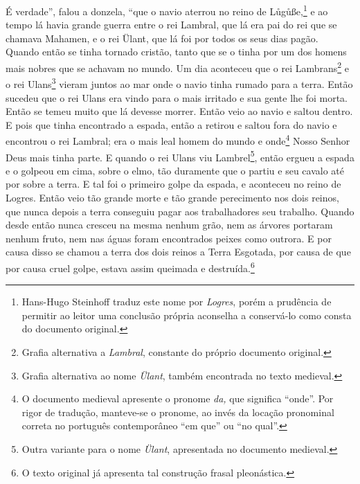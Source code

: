  É verdade”, falou a donzela, “que o navio aterrou no reino de
Lůgůße,\footnote{Hans-Hugo Steinhoff traduz este nome por \textit{Logres}, porém
a prudência de permitir ao leitor uma conclusão própria aconselha a conservá-lo
como consta do documento original.}  e ao tempo lá havia grande
guerra entre o rei Lambral, que lá era pai do rei que se chamava Mahamen, e o
rei Ülant, que lá foi por todos os seus dias pagão. Quando então se tinha
tornado cristão, tanto que se o tinha por um dos homens mais nobres que se
achavam no mundo. Um dia aconteceu que o rei Lambrans\footnote{ Grafia
alternativa a \textit{Lambral}, constante do próprio documento original.
 } e o rei Ulans\footnote{ Grafia alternativa ao nome \textit{Ülant},
também encontrada no texto medieval.}  vieram juntos ao mar onde o
navio tinha rumado para a terra. Então sucedeu que o rei Ulans era vindo para o
mais irritado e sua gente lhe foi morta. Então se temeu muito que lá devesse
morrer. Então veio ao navio e saltou dentro. E pois que tinha encontrado a
espada, então a retirou e saltou fora do navio e encontrou o rei Lambral; era o
mais leal homem do mundo e onde\footnote{ O documento medieval apresente o
pronome \textit{da, }que significa “onde”. Por rigor de tradução, manteve-se o
pronome, ao invés da locação pronominal correta no português contemporâneo “em
que” ou “no qual”.}  Nosso Senhor Deus mais tinha parte. E quando o
rei Ulans viu Lambrel\footnote{ Outra variante para o nome \textit{Ülant},
apresentada no documento medieval.},  então ergueu a espada e o
golpeou em cima, sobre o elmo, tão duramente que o partiu e seu cavalo até por
sobre a terra. E tal foi o primeiro golpe da espada, e aconteceu no reino de
Logres. Então veio tão grande morte e tão grande perecimento nos dois reinos,
que nunca depois a terra conseguiu pagar aos trabalhadores seu trabalho. Quando
desde então nunca cresceu na mesma nenhum grão, nem as árvores portaram nenhum
fruto, nem nas águas foram encontrados peixes como outrora. E por causa disso
se chamou a terra dos dois reinos a Terra Esgotada, por causa de que por causa
cruel golpe, estava assim queimada e destruída.\footnote{ O texto original já
apresenta tal construção frasal pleonástica.}  

